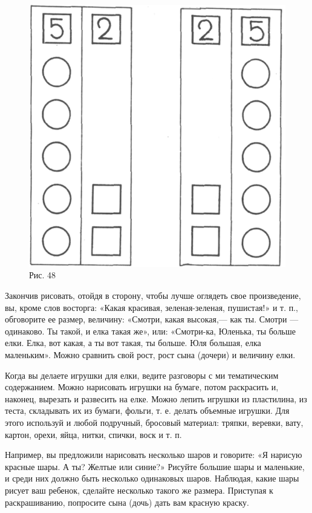 \documentclass{book}
\begin{document}
\begin{figure}
\centering
\includegraphics[width=\linewidth]{media/media/image44.png}
\caption*{Рис. 48}
\end{figure}


Закончив рисовать, отойдя в сторону, чтобы лучше оглядеть свое
произведение, вы, кроме слов восторга: «Какая красивая, зеленая-зеленая,
пушистая!» и т. п., обговорите ее размер, величину: «Смотри, какая
высокая,--- как ты. Смотри --- одинаково. Ты такой, и елка такая же»,
или: «Смотри-ка, Юленька, ты больше елки. Елка, вот какая, а ты вот
такая, ты больше. Юля большая, елка маленьким». Можно сравнить свой
рост, рост сына (дочери) и величину елки.

Когда вы делаете игрушки для елки, ведите разговоры с ми тематическим
содержанием. Можно нарисовать игрушки на бумаге, потом раскрасить и,
наконец, вырезать и развесить на елке. Можно лепить игрушки из
пластилина, из теста, складывать их из бумаги, фольги, т. е. делать
объемные игрушки. Для этого используй и любой подручный, бросовый
материал: тряпки, веревки, вату, картон, орехи, яйца, нитки, спички,
воск и т. п.

Например, вы предложили нарисовать несколько шаров и говорите: «Я
нарисую красные шары. А ты? Желтые или синие?» Рисуйте большие шары и
маленькие, и среди них должно быть несколько одинаковых шаров. Наблюдая,
какие шары рисует ваш ребенок, сделайте несколько такого же размера.
Приступая к раскрашиванию, попросите сына (дочь) дать вам красную
краску.
\end{document}
